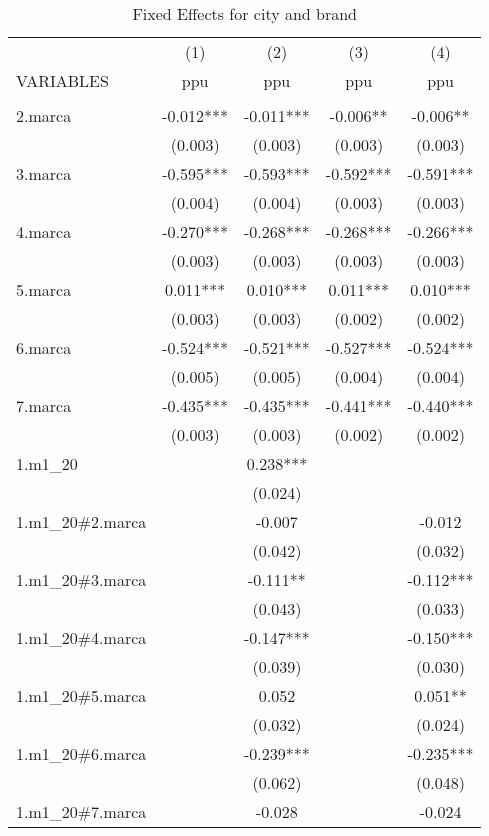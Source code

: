 \begin{longtable}{lcccc} 
\caption{Fixed Effects for city and brand}\label{tab:1}\\	
	\hline
 & (1) & (2) & (3) & (4) \\
VARIABLES & ppu & ppu & ppu & ppu \\ \hline
 &  &  &  &  \\
2.marca & -0.012*** & -0.011*** & -0.006** & -0.006** \\
 & (0.003) & (0.003) & (0.003) & (0.003) \\
3.marca & -0.595*** & -0.593*** & -0.592*** & -0.591*** \\
 & (0.004) & (0.004) & (0.003) & (0.003) \\
4.marca & -0.270*** & -0.268*** & -0.268*** & -0.266*** \\
 & (0.003) & (0.003) & (0.003) & (0.003) \\
5.marca & 0.011*** & 0.010*** & 0.011*** & 0.010*** \\
 & (0.003) & (0.003) & (0.002) & (0.002) \\
6.marca & -0.524*** & -0.521*** & -0.527*** & -0.524*** \\
 & (0.005) & (0.005) & (0.004) & (0.004) \\
7.marca & -0.435*** & -0.435*** & -0.441*** & -0.440*** \\
 & (0.003) & (0.003) & (0.002) & (0.002) \\
1.m1\_20 &  & 0.238*** &  &  \\
 &  & (0.024) &  &  \\
1.m1\_20\#2.marca &  & -0.007 &  & -0.012 \\
 &  & (0.042) &  & (0.032) \\
1.m1\_20\#3.marca &  & -0.111** &  & -0.112*** \\
 &  & (0.043) &  & (0.033) \\
1.m1\_20\#4.marca &  & -0.147*** &  & -0.150*** \\
 &  & (0.039) &  & (0.030) \\
1.m1\_20\#5.marca &  & 0.052 &  & 0.051** \\
 &  & (0.032) &  & (0.024) \\
1.m1\_20\#6.marca &  & -0.239*** &  & -0.235*** \\
 &  & (0.062) &  & (0.048) \\
1.m1\_20\#7.marca &  & -0.028 &  & -0.024 \\

\end{longtable}
